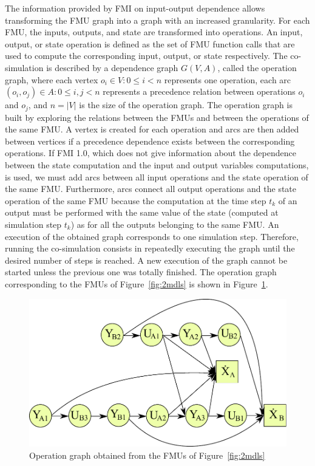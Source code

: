 The information provided by FMI on input-output dependence allows transforming the FMU graph into a graph with an increased granularity. For each FMU, the inputs, outputs, and state are transformed into operations. An input, output, or state operation is defined as the set of FMU function calls that are used to compute the corresponding input, output, or state respectively. The co-simulation is described by a dependence graph $G(V,A)$, called the operation graph, where each vertex $o_i \in V: 0 \leq i < n$ represents one operation, each arc $(o_i,o_j) \in A: 0 \leq i,j < n$ represents a precedence relation between operations $o_i$ and $o_j$, and $n = |V|$ is the size of the operation graph. The operation graph is built by exploring the relations between the FMUs and between the operations of the same FMU. A vertex is created for each operation and arcs are then added between vertices if a precedence dependence exists between the corresponding operations. If FMI 1.0, which does not give information about the dependence between the state computation and the input and output variables computations, is used, we must add arcs between all input operations and the state operation of the same FMU. Furthermore, arcs connect all output operations and the state operation of the same FMU because the computation at the time step $t_k$ of an output must be performed with the same value of the state (computed at simulation step $t_k$) as for all the outputs belonging to the same FMU. An execution of the obtained graph corresponds to one simulation step. Therefore, running the co-simulation consists in repeatedly executing the graph until the desired number of steps is reached. A new execution of the graph cannot be started unless the previous one was totally finished. The operation graph corresponding to the FMUs of Figure~\ref{fig:2mdls} is shown in Figure~\ref{fig:dag}.

\begin{figure}[htb]
\centering
  \includegraphics[scale=0.5]{figures/Operation_Graph_Two_Models}
\caption{Operation graph obtained from the FMUs of Figure~\ref{fig:2mdls}}
\label{fig:dag}
\end{figure} 

